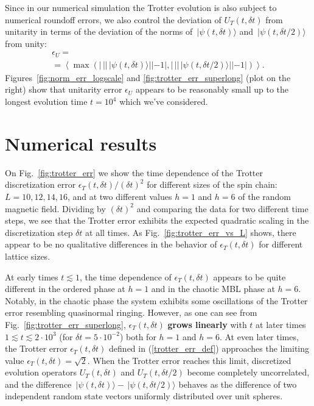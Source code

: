 \documentclass[10pt,amsmath,amssymb,twocolumn,superscriptaddress,groupedaddress,nofootinbib,aps,prd,twocolumn]{revtex4-2}
\newcommand{\lr}[1]{\left(#1\right)}
\newcommand{\vev}[1]{\left\langle #1 \right\rangle}
\newcommand{\ket}[1]{ \, | #1 \rangle }
\begin{document}
Since in our numerical simulation the Trotter evolution is also subject to numerical roundoff errors, we also control the deviation of $U_T\lr{t, {\delta t}}$ from unitarity in terms of the deviation of the norms of $\ket{\psi\lr{t, {\delta t}}}$ and $\ket{\psi\lr{t, {\delta t}/2}}$ from unity:
\begin{eqnarray}
\label{norm_err_def}
 \epsilon_U =
 \nonumber \\ =
  \vev{ \max\lr{
  \left| \, ||\ket{\psi\lr{t, {\delta t}}}|| - 1 \right|,
  \left| \, ||\ket{\psi\lr{t, {\delta t}/2}}|| - 1 \right|
 } } .
\end{eqnarray}
Figures~\ref{fig:norm_err_logscale} and \ref{fig:trotter_err_superlong} (plot on the right) show that unitarity error $\epsilon_U$ appears to be reasonably small up to the longest evolution time $t = 10^4$ which we've considered.

\section{Numerical results}
\label{sec:numres}

On Fig.~\ref{fig:trotter_err} we show the time dependence of the Trotter discretization error $\epsilon_T\lr{t, {\delta t}}/\lr{\delta t}^2$ for different sizes of the spin chain: $L = 10, 12, 14, 16$, and at two different values $h = 1$ and $h = 6$ of the random magnetic field. Dividing by $\lr{\delta t}^2$ and comparing the data for two different time steps, we see that the Trotter error exhibits the expected quadratic scaling in the discretization step $\delta t$ at all times. As Fig.~\ref{fig:trotter_err_vs_L} shows, there appear to be no qualitative differences in the behavior of $\epsilon_T\lr{t, \delta t}$ for different lattice sizes.

At early times $t \lesssim 1$, the time dependence of $\epsilon_T\lr{t, \delta t}$ appears to be quite different in the ordered phase at $h = 1$ and in the chaotic MBL phase at $h = 6$. Notably, in the chaotic phase the system exhibits some oscillations of the Trotter error resembling quasinormal ringing. However, as one can see from Fig.~\ref{fig:trotter_err_superlong}, $\epsilon_T\lr{t, \delta t}$ \textbf{grows linearly} with $t$ at later times $ 1 \lesssim t \lesssim 2 \cdot 10^3$ (for ${\delta t} = 5 \cdot 10^{-2}$) both for $h=1$ and $h=6$. At even later times, the Trotter error $\epsilon_T\lr{t, \delta t}$ defined in (\ref{trotter_err_def}) approaches the limiting value $\epsilon_T\lr{t, \delta t} = \sqrt{2}$. When the Trotter error reaches this limit, discretized evolution operators $U_T\lr{t, {\delta t}}$ and $U_T\lr{t, {\delta t}/2}$ become completely uncorrelated, and the difference $\ket{\psi\lr{t, {\delta t}}} - \ket{\psi\lr{t, {\delta t}/2}}$ behaves as the difference of two independent random state vectors uniformly distributed over unit spheres.
\end{document}
